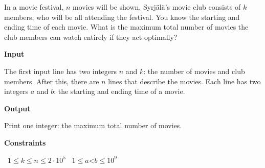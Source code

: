In a movie festival, $n$ movies will be shown. Syrjälä's movie club consists of $k$ members, who will be all attending the festival.
You know the starting and ending time of each movie. What is the maximum total number of movies the club members can watch entirely if they act optimally?

\vspace{0.3cm}\noindent\textbf{Input}

The first input line has two integers $n$ and $k$: the number of movies and club members.
After this, there are $n$ lines that describe the movies. Each line has two integers $a$ and $b$: the starting and ending time of a movie.

\vspace{0.3cm}\noindent\textbf{Output}

Print one integer: the maximum total number of movies.

\vspace{0.3cm}\noindent\textbf{Constraints}

\textbullet\ $1 \le k \le n \le 2 \cdot 10^5$
\textbullet\ $1 \le a $<$ b \le 10^9$